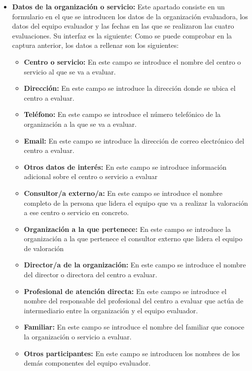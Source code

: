     \begin{itemize}
        \item \textbf{Datos de la organización o servicio:} Este apartado consiste en un formulario en el que se introducen los datos de la organización evaluadora, los datos del equipo evaluador y las fechas en las que se realizaron las cuatro evaluaciones. Su interfaz es la siguiente:
        Como se puede comprobar en la captura anterior, los datos a rellenar son los siguientes:
        \begin{itemize}
            \item \textbf{Centro o servicio: }En este campo se introduce el nombre del centro o servicio al que se va a evaluar.
            \item \textbf{Dirección: }En este campo se introduce la dirección donde se ubica el centro a evaluar.
            \item \textbf{Teléfono: }En este campo se introduce el número telefónico de la organización a la que se va a evaluar.
            \item \textbf{Email: }En este campo se introduce la dirección de correo electrónico del centro a evaluar.
            \item \textbf{Otros datos de interés: }En este campo se introduce información adicional sobre el centro o servicio a evaluar
            \item \textbf{Consultor/a externo/a: }En este campo se introduce el nombre completo de la persona que lidera el equipo que va a realizar la valoración a ese centro o servicio en concreto.
            \item \textbf{Organización a la que pertenece: }En este campo se introduce la organización a la que pertenece el consultor externo que lidera el equipo de valoración
            \item \textbf{Director/a de la organización: }En este campo se introduce el nombre del director o directora del centro a evaluar.
            \item \textbf{Profesional de atención directa: }En este campo se introduce el nombre del responsable del profesional del centro a evaluar que actúa de intermediario entre la organización y el equipo evaluador.
            \item \textbf{Familiar: }En este campo se introduce el nombre del familiar que conoce la organización o servicio a evaluar.
            \item \textbf{Otros participantes: }En este campo se introducen los nombres de los demás componentes del equipo evaluador.

\end{itemize}
\end{itemize}
